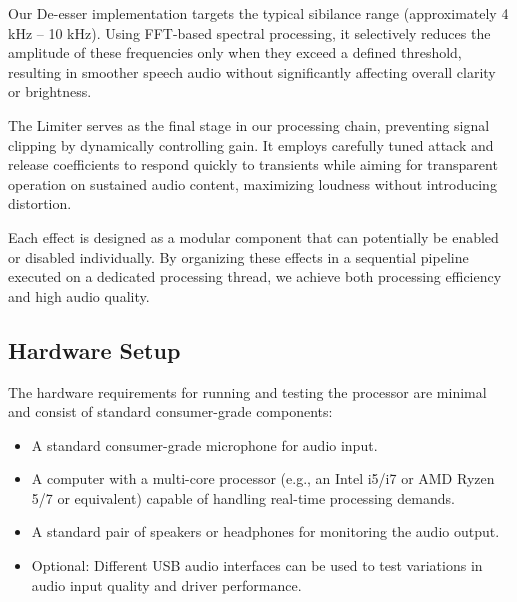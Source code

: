 \documentclass[conference]{IEEEtran}
\begin{document}
Our De-esser implementation targets the typical sibilance range (approximately 4 kHz – 10 kHz). Using FFT-based spectral processing, it selectively reduces the amplitude of these frequencies only when they exceed a defined threshold, resulting in smoother speech audio without significantly affecting overall clarity or brightness.

The Limiter serves as the final stage in our processing chain, preventing signal clipping by dynamically controlling gain. It employs carefully tuned attack and release coefficients to respond quickly to transients while aiming for transparent operation on sustained audio content, maximizing loudness without introducing distortion.

Each effect is designed as a modular component that can potentially be enabled or disabled individually. By organizing these effects in a sequential pipeline executed on a dedicated processing thread, we achieve both processing efficiency and high audio quality.

\subsection*{Hardware Setup}
The hardware requirements for running and testing the processor are minimal and consist of standard consumer-grade components:
\begin{itemize}
    \item A standard consumer-grade microphone for audio input.
    \item A computer with a multi-core processor (e.g., an Intel i5/i7 or AMD Ryzen 5/7 or equivalent) capable of handling real-time processing demands.
    \item A standard pair of speakers or headphones for monitoring the audio output.
    \item Optional: Different USB audio interfaces can be used to test variations in audio input quality and driver performance.
\end{itemize}
\end{document}
